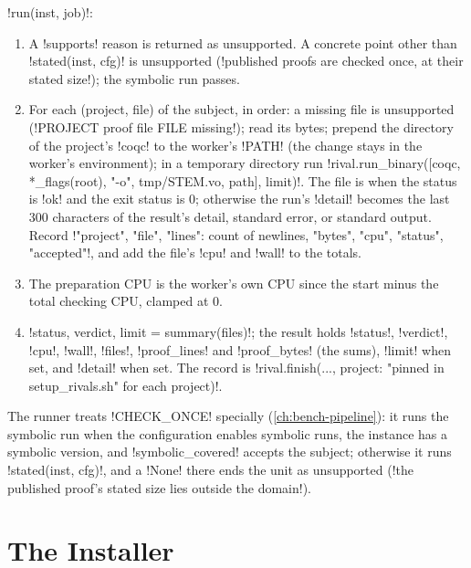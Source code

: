 {\begin{algorithm}\label{alg:bench-tools-proofs}
\py!run(inst, job)!:
\begin{enumerate}
\item A \py!supports! reason is returned as unsupported. A concrete point other than \py!stated(inst, cfg)! is unsupported (\code!published proofs are checked once, at their stated size!); the symbolic run passes.
\item For each (project, file) of the subject, in order: a missing file is unsupported (\code!PROJECT proof file FILE missing!); read its bytes; prepend the directory of the project's \code!coqc! to the worker's \code!PATH! (the change stays in the worker's environment); in a temporary directory run \py!rival.run_binary([coqc, *_flags(root), "-o", tmp/STEM.vo, path], limit)!. The file is  when the status is \code!ok! and the exit status is $0$; otherwise the run's \code!detail! becomes the last 300 characters of the result's detail, standard error, or standard output. Record \py!{"project", "file", "lines": count of newlines, "bytes", "cpu", "status", "accepted"}!, and add the file's \code!cpu! and \code!wall! to the totals.
\item The preparation CPU is the worker's own CPU since the start minus the total checking CPU, clamped at $0$.
\item \py!status, verdict, limit = summary(files)!; the result holds \code!status!, \code!verdict!, \code!cpu!, \code!wall!, \code!files!, \code!proof_lines! and \code!proof_bytes! (the sums), \code!limit! when set, and \code!detail! when set. The record is \py!rival.finish(..., {project: "pinned in setup_rivals.sh" for each project})!.
\end{enumerate}
\end{algorithm}

The runner treats \py!CHECK_ONCE! specially (\cref{ch:bench-pipeline}): it runs the symbolic run when the configuration enables symbolic runs, the instance has a symbolic version, and \py!symbolic_covered! accepts the subject; otherwise it runs \py!stated(inst, cfg)!, and a \py!None! there ends the unit as unsupported (\code!the published proof's stated size lies outside the domain!).

\section{The Installer}\label{sec:bench-tools-setup}

}
